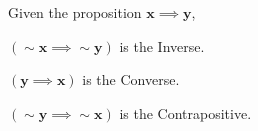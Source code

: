 %
%

\begin{subquestions}

 
\subquestion
Given the proposition $\boldsymbol{x \implies y}$,

\begin{subsubquestions}


\subsubquestion

$\boldsymbol{(\sim x \implies \sim y)}$ is the Inverse.


\subsubquestion

$\boldsymbol{(y \implies x)}$ is the Converse.


\subsubquestion

$\boldsymbol{(\sim y \implies \sim x)}$ is the Contrapositive.

\end{subsubquestions}
	

\subquestion

\begin{subsubquestions}



\end{subsubquestions}
\end{subquestions}
